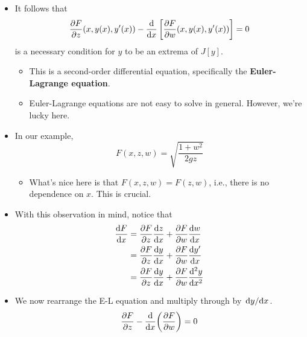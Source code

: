 \documentclass[../notes.tex]{subfiles}
\begin{document}
\begin{itemize}
\begin{itemize}
        \begin{equation*}
            \int_a^b\phi(x)h(x)\dd{x} = 0
        \end{equation*}
        then $\phi(x)=0$.
        \begin{proof}
            Suppose for the sake of contradiction that (WLOG) $\phi(x_0)>0$. Then within some neighborhood $N_\delta(x)$ of $x_0$, $\phi(x)>0$ for all $x\in N_\delta(x)$. Now choose $h$ to be a bump function on that interval. Then $\int_a^b\phi(x)h(x)\dd{x}>0$, a contradiction.
        \end{proof}
        \item It follows that
        \begin{equation*}
            {\pdv{F}{z}}(x,y(x),y'(x))-\dv{x}\left[ {\pdv{F}{w}}(x,y(x),y'(x)) \right] = 0
        \end{equation*}
        is a necessary condition for $y$ to be an extrema of $J[y]$.
        \begin{itemize}
            \item This is a second-order differential equation, specifically the \textbf{Euler-Lagrange equation}.
            \item Euler-Lagrange equations are not easy to solve in general. However, we're lucky here.
        \end{itemize}
        \item In our example,
        \begin{equation*}
            F(x,z,w) = \sqrt{\frac{1+w^2}{2gz}}
        \end{equation*}
        \begin{itemize}
            \item What's nice here is that $F(x,z,w)=F(z,w)$, i.e., there is no dependence on $x$. This is crucial.
        \end{itemize}
        \item With this observation in mind, notice that
        \begin{align*}
            \dv{F}{x} &= \pdv{F}{z}\dv{z}{x}+\pdv{F}{w}\dv{w}{x}\\
            &= \pdv{F}{z}\dv{y}{x}+\pdv{F}{w}\dv{y'}{x}\\
            &= \pdv{F}{z}\dv{y}{x}+\pdv{F}{w}\dv[2]{y}{x}
        \end{align*}
        \item We now rearrange the E-L equation and multiply through by $\dv*{y}{x}$.
        \begin{align*}
            \pdv{F}{z}-\dv{x}(\pdv{F}{w}) &= 0\\

\end{align*}
\end{itemize}
\end{itemize}
\end{document}
